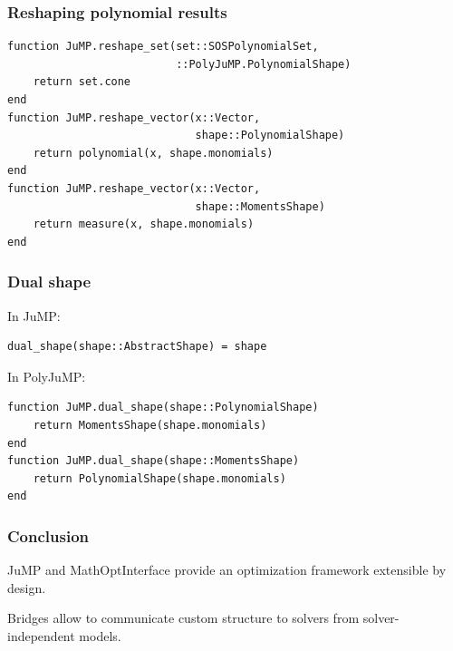 \documentclass{beamer}
\begin{document}
\begin{frame}[fragile]
  \frametitle{Reshaping polynomial results}
\begin{verbatim}
function JuMP.reshape_set(set::SOSPolynomialSet,
                          ::PolyJuMP.PolynomialShape)
    return set.cone
end
function JuMP.reshape_vector(x::Vector,
                             shape::PolynomialShape)
    return polynomial(x, shape.monomials)
end
function JuMP.reshape_vector(x::Vector,
                             shape::MomentsShape)
    return measure(x, shape.monomials)
end
\end{verbatim}
\end{frame}

\begin{frame}[fragile]
  \frametitle{Dual shape}
  In JuMP:
\begin{verbatim}
dual_shape(shape::AbstractShape) = shape
\end{verbatim}
  In PolyJuMP:
\begin{verbatim}
function JuMP.dual_shape(shape::PolynomialShape)
    return MomentsShape(shape.monomials)
end
function JuMP.dual_shape(shape::MomentsShape)
    return PolynomialShape(shape.monomials)
end
\end{verbatim}
\end{frame}

\begin{frame}
  \frametitle{Conclusion}
  JuMP and MathOptInterface provide an optimization framework \alert{extensible} by \alert{design}.

  \vspace{4em}

  Bridges allow to communicate \alert{custom} structure to solvers from \alert{solver-independent} models.
\end{frame}
\end{document}
